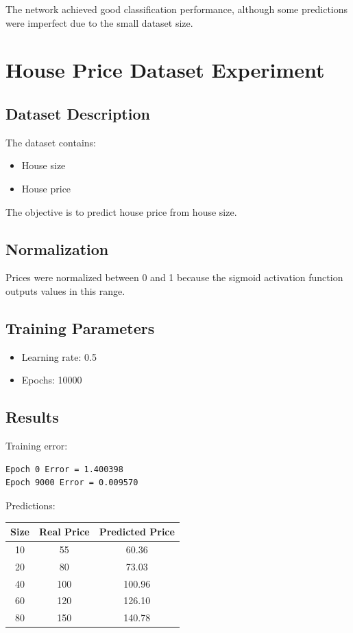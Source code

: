\documentclass[a4paper,12pt]{article}
\begin{document}
The network achieved good classification performance, although some predictions were imperfect due to the small dataset size.

\section{House Price Dataset Experiment}

\subsection{Dataset Description}

The dataset contains:
\begin{itemize}
    \item House size
    \item House price
\end{itemize}

The objective is to predict house price from house size.

\subsection{Normalization}

Prices were normalized between 0 and 1 because the sigmoid activation function outputs values in this range.

\subsection{Training Parameters}

\begin{itemize}
    \item Learning rate: 0.5
    \item Epochs: 10000
\end{itemize}

\subsection{Results}

Training error:

\begin{verbatim}
Epoch 0 Error = 1.400398
Epoch 9000 Error = 0.009570
\end{verbatim}

Predictions:

\begin{center}
\begin{tabular}{ccc}
\toprule
Size & Real Price & Predicted Price \\
\midrule
10 & 55 & 60.36 \\
20 & 80 & 73.03 \\
40 & 100 & 100.96 \\
60 & 120 & 126.10 \\
80 & 150 & 140.78 \\
\bottomrule
\end{tabular}
\end{center}
\end{document}
